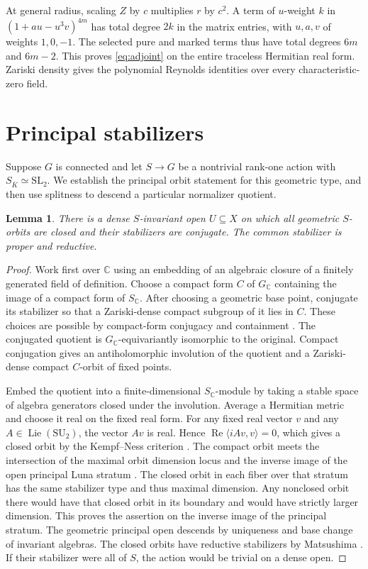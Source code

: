 \documentclass[11pt]{article}
\newtheorem{lemma}[theorem]{Lemma}
\newcommand{\CC}{\mathbb C}
\newcommand{\SL}{\mathrm{SL}}
\newcommand{\SU}{\mathrm{SU}}
\newcommand{\Lie}{\operatorname{Lie}}
\begin{document}
At general radius, scaling \(Z\) by \(c\) multiplies \(r\) by \(c^2\).
A term of \(u\)-weight \(k\) in \((1+au-u^3v)^{4m}\) has total degree
\(2k\) in the matrix entries, with \(u,a,v\) of weights \(1,0,-1\).
The selected pure and marked terms thus have total degrees \(6m\)
and \(6m-2\). This proves \eqref{eq:adjoint} on the entire traceless
Hermitian real form. Zariski density gives the polynomial Reynolds
identities over every characteristic-zero field.

\section{Principal stabilizers}\label{sec:principal}

Suppose \(G\) is connected and let \(S\to G\) be a nontrivial rank-one
action with \(S_{\overline K}\simeq\SL_2\). We establish the principal
orbit statement for this geometric type, and then use splitness to
descend a particular normalizer quotient.

\begin{lemma}\label{lem:principal}
There is a dense \(S\)-invariant open \(U\subseteq X\) on which all
geometric \(S\)-orbits are closed and their stabilizers are conjugate.
The common stabilizer is proper and reductive.
\end{lemma}

\begin{proof}
Work first over \(\CC\) using an embedding of an algebraic closure of
a finitely generated field of definition. Choose a compact form \(C\)
of \(G_\CC\) containing the image of a compact form of \(S_\CC\).
After choosing a geometric base point, conjugate its stabilizer so
that a Zariski-dense compact subgroup of it lies in \(C\).
These choices are possible by compact-form conjugacy and containment
\cite[Theorems~3.7--3.8]{AdamsTaibi}. The conjugated quotient is
\(G_\CC\)-equivariantly isomorphic to the original. Compact conjugation
gives an antiholomorphic involution of the quotient and a Zariski-dense
compact \(C\)-orbit of fixed points.

Embed the quotient into a finite-dimensional \(S_\CC\)-module by
taking a stable space of algebra generators closed under the
involution. Average a Hermitian metric and choose it real on the
fixed real form. For any fixed real vector \(v\) and any
\(A\in\Lie(\SU_2)\), the vector \(Av\) is real. Hence
\(\operatorname{Re}\langle iAv,v\rangle=0\), which gives a closed
orbit by the Kempf--Ness criterion \cite{KempfNess}.
The compact orbit meets the intersection of the maximal orbit dimension
locus and the inverse image of the open principal Luna stratum
\cite[Part~III, \S3]{Luna}.
The closed orbit in each fiber over that stratum has the same
stabilizer type and thus maximal dimension. Any nonclosed orbit
there would have that closed orbit in its boundary and would have
strictly larger dimension. This proves the assertion on the inverse
image of the principal stratum. The geometric principal open
descends by uniqueness and base change of invariant algebras.
The closed orbits have reductive stabilizers by Matsushima
\cite{Matsushima}. If their stabilizer were all of \(S\), the action
would be trivial on a dense open.
\end{proof}
\end{document}
